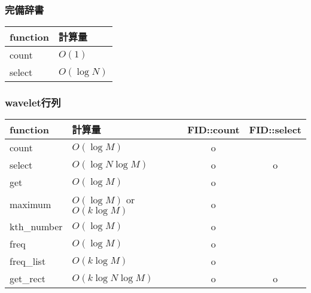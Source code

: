 \subsubsection{完備辞書}
\begin{table} [htb]
  \begin{tabular} { |l|l| } \hline
    function & 計算量 \\ \hline
    count & $O(1)$ \\ \hline
    select & $O(\log N)$ \\ \hline
  \end{tabular}
\end{table}

\subsubsection{wavelet行列}
\begin{table} [htb]
  \begin{tabular} { |l|l|c|c| } \hline
    function & 計算量 & FID::count & FID::select\\ \hline
    count & $O(\log M)$ & o & \\ \hline
    select & $O(\log N \log M)$ & o & o \\ \hline
    get & $O(\log M)$ & o & \\ \hline
    maximum & $O(\log M)$ or $O(k\log M)$ & o & \\ \hline
    kth\_number & $O(\log M)$ & o & \\ \hline
    freq & $O(\log M)$ & o & \\ \hline
    freq\_list & $O(k\log M)$ & o & \\ \hline
    get\_rect & $O(k\log N \log M)$ & o & o \\ \hline
  \end{tabular}
\end{table}

